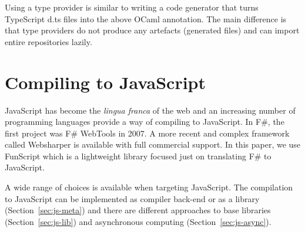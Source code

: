 \documentclass[submission,copyright,creativecommons]{eptcs}
\begin{document}
Using a type provider is similar to writing a code generator that turns TypeScript
\textcolor{strclr}{\ttfamily d.ts} files into the above OCaml annotation. The main difference
is that type providers do not produce any artefacts
(generated files) and can import entire repositories lazily.



%
%

\section{Compiling to JavaScript}
\label{sec:js}

JavaScript has become the \emph{lingua franca} of the web and an increasing number of programming
languages provide a way of compiling to JavaScript. In F\#, the first project was F\# WebTools
\cite{fsharp-webtools} in 2007. A more recent and complex framework called Websharper \cite{websharper-guis}
is available with full commercial support. In this paper, we use FunScript which is a lightweight
library focused just on translating F\# to JavaScript.

A wide range of choices is available when targeting JavaScript. The compilation to JavaScript can be
implemented as compiler back-end or as a library (Section~\ref{sec:js-meta}) and there are different
approaches to base libraries (Section~\ref{sec:js-lib}) and asynchronous computing
(Section~\ref{sec:js-async}).
\end{document}
